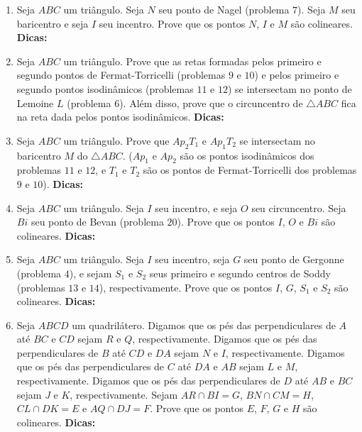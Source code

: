 \documentclass{article}
\newcommand{\dica}{\textbf{Dicas:}}
\newcommand{\iniTri}{Seja $ABC$ um triângulo}
\begin{document}
\begin{multicols}{2}
\begin{enumerate}
    \item \iniTri. Seja $N$ seu ponto de Nagel (problema $7$). Seja $M$ seu baricentro e seja $I$ seu incentro. Prove que os pontos $N$, $I$ e $M$ são colineares. \dica %
    
    \item \iniTri. Prove que as retas formadas pelos primeiro e segundo pontos de Fermat-Torricelli (problemas $9$ e $10$) e pelos primeiro e segundo pontos isodinâmicos (problemas $11$ e $12$) se intersectam no ponto de Lemoine $L$ (problema $6$). Além disso, prove que o circuncentro de $\triangle ABC$ fica na reta dada pelos pontos isodinâmicos. \dica %
    
    \item \iniTri. Prove que $Ap_2T_1$ e $Ap_1T_2$ se intersectam no baricentro $M$ do $\triangle ABC$. ($Ap_1$ e $Ap_2$ são os pontos isodinâmicos dos problemas $11$ e $12$, e $T_1$ e $T_2$ são os pontos de Fermat-Torricelli dos problemas $9$ e $10$). \dica %
    
    \item \iniTri. Seja $I$ seu incentro, e seja $O$ seu circuncentro. Seja $Bi$ seu ponto de Bevan (problema $20$). Prove que os pontos $I$, $O$ e $Bi$ são colineares. \dica %
    
    \item \iniTri. Seja $I$ seu incentro, seja $G$ seu ponto de Gergonne (problema $4$), e sejam $S_1$ e $S_2$ seus primeiro e segundo centros de Soddy (problemas $13$ e $14$), respectivamente. Prove que os pontos $I$, $G$, $S_1$ e $S_2$ são colineares. \dica %
    
    \item Seja $ABCD$ um quadrilátero. Digamos que os pés das perpendiculares de $A$ até $BC$ e $CD$ sejam $R$ e $Q$, respectivamente. Digamos que os pés das perpendiculares de $B$ até $CD$ e $DA$ sejam $N$ e $I$, respectivamente. Digamos que os pés das perpendiculares de $C$ até $DA$ e $AB$ sejam $L$ e $M$, respectivamente. Digamos que os pés das perpendiculares de $D$ até $AB$ e $BC$ sejam $J$ e $K$, respectivamente. Sejam $AR\cap BI=G$, $BN\cap CM=H$, $CL\cap DK=E$ e $AQ\cap DJ=F$. Prove que os pontos $E$, $F$, $G$ e $H$ são colineares. \dica %
    

\end{enumerate}
\end{multicols}
\end{document}
